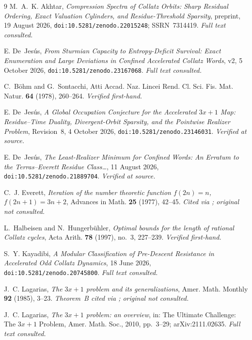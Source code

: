 \documentclass[11pt,a4paper]{article}
\theoremstyle{plain}
\theoremstyle{definition}
\begin{document}
\begin{thebibliography}{9}
M.~A.~K. Akhtar, \emph{Compression Spectra of Collatz Orbits: Sharp Residual
Ordering, Exact Valuation Cylinders, and Residue-Threshold Sparsity},
preprint, 19 August 2026, \texttt{doi:10.5281/zenodo.22015248};
SSRN~7314419. \emph{Full text consulted.}

E. De~Jes\'us, \emph{From Sturmian Capacity to Entropy-Deficit Survival: Exact
Enumeration and Large Deviations in Confined Accelerated Collatz Words}, v2,
5 October 2026, \texttt{doi:10.5281/zenodo.23167068}. \emph{Full text
consulted.}

C.~B\"ohm and G.~Sontacchi, Atti Accad. Naz. Lincei Rend. Cl. Sci. Fis. Mat.
Natur. \textbf{64} (1978), 260--264. \emph{Verified first-hand.}

E. De~Jes\'us, \emph{A Global Occupation Conjecture for the Accelerated $3x+1$
Map: Residue--Time Duality, Divergent-Orbit Sparsity, and the Pointwise
Realizer Problem}, Revision~8, 4 October 2026,
\texttt{doi:10.5281/zenodo.23146031}. \emph{Verified at source.}

E. De~Jes\'us, \emph{The Least-Realizer Minimum for Confined Words: An Erratum
to the Terras--Everett Residue Class\dots}, 11 August 2026,
\texttt{doi:10.5281/zenodo.21889704}. \emph{Verified at source.}

C.~J. Everett, \emph{Iteration of the number theoretic function
$f(2n)=n$, $f(2n+1)=3n+2$}, Advances in Math. \textbf{25} (1977), 42--45.
\emph{Cited via \cite{lagarias2010}; original not consulted.}

L.~Halbeisen and N.~Hungerb\"uhler, \emph{Optimal bounds for the length of
rational Collatz cycles}, Acta Arith. \textbf{78} (1997), no.~3, 227--239.
\emph{Verified first-hand.}

S.~Y. Kayadibi, \emph{A Modular Classification of Pre-Descent Resistance in
Accelerated Odd Collatz Dynamics}, 18 June 2026,
\texttt{doi:10.5281/zenodo.20745800}. \emph{Full text consulted.}

J.~C. Lagarias, \emph{The $3x+1$ problem and its generalizations}, Amer. Math.
Monthly \textbf{92} (1985), 3--23. \emph{Theorem~B cited via
\cite{lagarias2010}; original not consulted.}

J.~C. Lagarias, \emph{The $3x+1$ problem: an overview}, in: The Ultimate
Challenge: The $3x+1$ Problem, Amer. Math. Soc., 2010, pp.~3--29;
arXiv:2111.02635. \emph{Full text consulted.}


\end{thebibliography}
\end{document}
